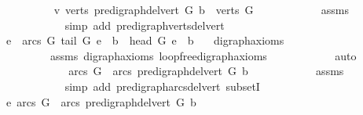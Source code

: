 \begin{isabellebody}
\ \ \ \ \ \ \ \ \isamarkupfalse%
\ v{\isacharcolon}{\kern0pt}\ {\isachardoublequoteopen}verts\ {\isacharparenleft}{\kern0pt}pre{\isacharunderscore}{\kern0pt}digraph{\isachardot}{\kern0pt}del{\isacharunderscore}{\kern0pt}vert\ G\ b{\isacharparenright}{\kern0pt}\ {\isacharequal}{\kern0pt}\ verts\ G{\isachardoublequoteclose}\isanewline
\ \ \ \ \ \ \ \ \ \ \isamarkupfalse%
\ assms{\isacharparenleft}{\kern0pt}{}{\isacharparenright}{\kern0pt}\isanewline
\ \ \ \ \ \ \ \ \ \ \isamarkupfalse%
\ {\isacharparenleft}{\kern0pt}simp\ add{\isacharcolon}{\kern0pt}\ pre{\isacharunderscore}{\kern0pt}digraph{\isachardot}{\kern0pt}verts{\isacharunderscore}{\kern0pt}del{\isacharunderscore}{\kern0pt}vert{\isacharparenright}{\kern0pt}\ \isanewline
\ \ \ \ \ \ \ \ \isamarkupfalse%
\ {\isachardoublequoteopen}{\isasymforall}e\ {\isasymin}\ arcs\ G{\isachardot}{\kern0pt}\ tail\ G\ e\ {\isasymnoteq}\ b\ {\isasymand}\ head\ G\ e\ {\isasymnoteq}\ b\ {\isachardoublequoteclose}\ \isamarkupfalse%
\ digraph{\isacharunderscore}{\kern0pt}axioms\isanewline
\ \ \ \ \ \ \ \ \ assms\ digraph{\isachardot}{\kern0pt}axioms{\isacharparenleft}{\kern0pt}{}{\isacharparenright}{\kern0pt}\ loopfree{\isacharunderscore}{\kern0pt}digraph{\isachardot}{\kern0pt}axioms{\isacharparenleft}{\kern0pt}{}{\isacharparenright}{\kern0pt}\isanewline
\ \ \ \ \ \ \ \ \ \ \isamarkupfalse%
\ auto\ \isanewline
\ \ \ \ \ \ \ \ \isamarkupfalse%
\ \isamarkupfalse%
\ {\isachardoublequoteopen}\ arcs\ G\ {\isasymsubseteq}\ arcs\ {\isacharparenleft}{\kern0pt}pre{\isacharunderscore}{\kern0pt}digraph{\isachardot}{\kern0pt}del{\isacharunderscore}{\kern0pt}vert\ G\ b{\isacharparenright}{\kern0pt}{\isachardoublequoteclose}\isanewline
\ \ \ \ \ \ \ \ \ \ \isamarkupfalse%
\ assms\isanewline
\ \ \ \ \ \ \ \ \ \ \isamarkupfalse%
\ {\isacharparenleft}{\kern0pt}simp\ add{\isacharcolon}{\kern0pt}\ pre{\isacharunderscore}{\kern0pt}digraph{\isachardot}{\kern0pt}arcs{\isacharunderscore}{\kern0pt}del{\isacharunderscore}{\kern0pt}vert\ subsetI{\isacharparenright}{\kern0pt}\ \isanewline
\ \ \ \ \ \ \ \ \isamarkupfalse%
\ \isamarkupfalse%
\ e{\isacharcolon}{\kern0pt}\ {\isachardoublequoteopen}arcs\ G\ {\isacharequal}{\kern0pt}\ arcs\ {\isacharparenleft}{\kern0pt}pre{\isacharunderscore}{\kern0pt}digraph{\isachardot}{\kern0pt}del{\isacharunderscore}{\kern0pt}vert\ G\ b{\isacharparenright}{\kern0pt}{\isachardoublequoteclose}\isanewline

\end{isabellebody}

